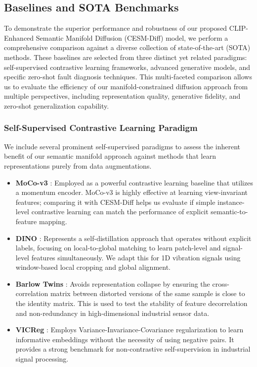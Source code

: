 \subsection{Baselines and SOTA Benchmarks}
\label{sec:baselines}

To demonstrate the superior performance and robustness of our proposed CLIP-Enhanced Semantic Manifold Diffusion (CESM-Diff) model, we perform a comprehensive comparison against a diverse collection of state-of-the-art (SOTA) methods. These baselines are selected from three distinct yet related paradigms: self-supervised contrastive learning frameworks, advanced generative models, and specific zero-shot fault diagnosis techniques. This multi-faceted comparison allows us to evaluate the efficiency of our manifold-constrained diffusion approach from multiple perspectives, including representation quality, generative fidelity, and zero-shot generalization capability.

\subsubsection{Self-Supervised Contrastive Learning Paradigm}
We include several prominent self-supervised paradigms to assess the inherent benefit of our semantic manifold approach against methods that learn representations purely from data augmentations. 
\begin{itemize}
    \item \textbf{MoCo-v3} \cite{chen2021mocov3}: Employed as a powerful contrastive learning baseline that utilizes a momentum encoder. MoCo-v3 is highly effective at learning view-invariant features; comparing it with CESM-Diff helps us evaluate if simple instance-level contrastive learning can match the performance of explicit semantic-to-feature mapping.
    \item \textbf{DINO} \cite{caron2021dino}: Represents a self-distillation approach that operates without explicit labels, focusing on local-to-global matching to learn patch-level and signal-level features simultaneously. We adapt this for 1D vibration signals using window-based local cropping and global alignment.
    \item \textbf{Barlow Twins} \cite{zbontar2021barlow}: Avoids representation collapse by ensuring the cross-correlation matrix between distorted versions of the same sample is close to the identity matrix. This is used to test the stability of feature decorrelation and non-redundancy in high-dimensional industrial sensor data.
    \item \textbf{VICReg} \cite{bardes2021vicreg}: Employs Variance-Invariance-Covariance regularization to learn informative embeddings without the necessity of using negative pairs. It provides a strong benchmark for non-contrastive self-supervision in industrial signal processing.
\end{itemize}

